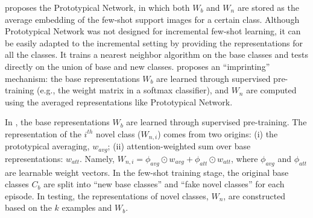 \documentclass[11pt]{article}
\begin{document}
 proposes the Prototypical Network, in which both $W_b$ and $W_n$ are stored as the average embedding of the few-shot support images for a certain class.
Although Prototypical Network was not designed for incremental few-shot learning, it can be easily adapted to the incremental setting by providing the representations for all the classes. It trains a nearest neighbor algorithm on the base classes and tests directly on the union of base and new classes.  proposes an ``imprinting'' mechanism: the base representations $W_b$ are learned through supervised pre-training (e.g., the weight matrix in a softmax classifier), and $W_n$ are computed using the averaged representations like Prototypical Network.


In \citet{DBLPGidarisK18}, the base representations $W_b$ are learned through supervised pre-training. The representation of the $i^{th}$ novel class ($W_{n,i}$) comes from two origins: (i) the prototypical averaging, $w_{avg}$; (ii) attention-weighted sum over base representations: $w_{att}$. Namely,  $W_{n,i}=\phi_{avg}\odot w_{avg}+\phi_{att}\odot w_{att}$, where $\phi_{avg}$ and $\phi_{att}$ are learnable weight vectors. In the few-shot training stage, the original base classes $C_b$ are split into ``new base classes'' and ``fake novel classes'' for each episode. In testing, the representations of novel classes, $W_n$, are constructed based on the $k$ examples and $W_b$.


\end{document}
